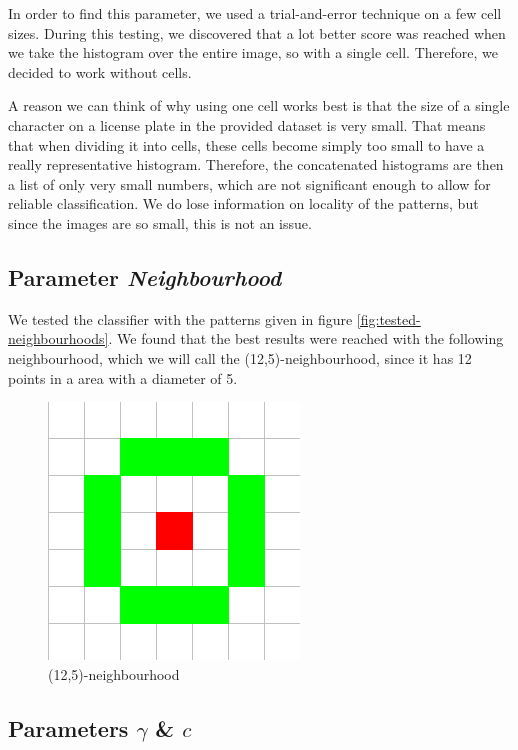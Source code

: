 \documentclass[a4paper]{article}
\begin{document}
In order to find this parameter, we used a trial-and-error technique on a few
cell sizes. During this testing, we discovered that a lot better score was
reached when we take the histogram over the entire image, so with a single
cell. Therefore, we decided to work without cells.

A reason we can think of why using one cell works best is that the size of a
single character on a license plate in the provided dataset is very small.
That means that when dividing it into cells, these cells become simply too
small to have a really representative histogram. Therefore, the
concatenated histograms are then a list of only very small numbers, which
are not significant enough to allow for reliable classification. We do lose
information on locality of the patterns, but since the images are so small,
this is not an issue.

\subsection{Parameter \emph{Neighbourhood}}

We tested the classifier with the patterns given in figure
\ref{fig:tested-neighbourhoods}. We found that the best results were reached
with the following neighbourhood, which we will call the (12,5)-neighbourhood,
since it has 12 points in a area with a diameter of 5.

\begin{figure}[H]
    \center
    \includegraphics[scale=0.5]{12-5neighbourhood.png}
    \caption{(12,5)-neighbourhood}
\end{figure}

\subsection{Parameters $\gamma$ \& $c$}
\end{document}
